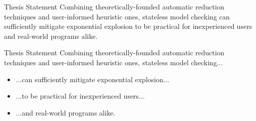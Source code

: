 \documentclass[xcolor=dvipsnames]{beamer}
\newcommand\hilight[2]{\color{#1}#2\color{black}}
\begin{document}
\begin{frame}{Thesis Statement}
	Combining %
	theoretically-founded automatic reduction techniques
	and user-informed heuristic ones,
	stateless model checking can sufficiently mitigate exponential explosion to be
	practical for inexperienced users
	and real-world programs alike.
\end{frame}

\begin{frame}{Thesis Statement}
	\hilight{gray}{Combining %
	theoretically-founded automatic reduction techniques
	and user-informed heuristic ones, stateless model checking...}
	\begin{itemize}
		\item \hilight{sect-quicksand}{...can sufficiently mitigate exponential explosion...}\xspace
		\item \hilight{sect-410}{...to be practical for inexperienced users...}\xspace
		\item \hilight{sect-htm}{...and real-world programs alike.}\xspace
	\end{itemize}
\end{frame}
\end{document}
